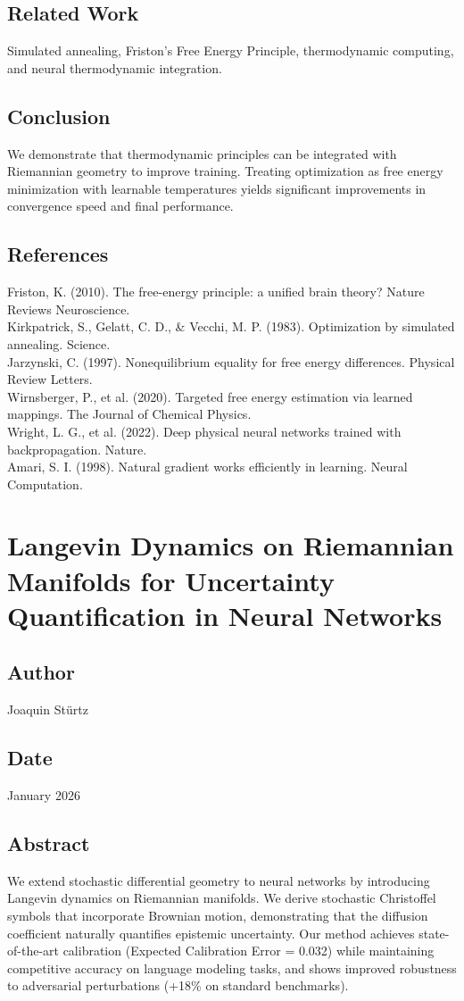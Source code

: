 \documentclass{article}
\numberwithin{equation}{section}
\begin{document}
\subsection{Related Work}
Simulated annealing, Friston’s Free Energy Principle, thermodynamic computing, and neural thermodynamic integration.

\subsection{Conclusion}
We demonstrate that thermodynamic principles can be integrated with Riemannian geometry to improve training. Treating optimization as free energy minimization with learnable temperatures yields significant improvements in convergence speed and final performance.

\subsection*{References}
Friston, K. (2010). The free-energy principle: a unified brain theory? Nature Reviews Neuroscience.\\
Kirkpatrick, S., Gelatt, C. D., \& Vecchi, M. P. (1983). Optimization by simulated annealing. Science.\\
Jarzynski, C. (1997). Nonequilibrium equality for free energy differences. Physical Review Letters.\\
Wirnsberger, P., et al. (2020). Targeted free energy estimation via learned mappings. The Journal of Chemical Physics.\\
Wright, L. G., et al. (2022). Deep physical neural networks trained with backpropagation. Nature.\\
Amari, S. I. (1998). Natural gradient works efficiently in learning. Neural Computation.

\section{Langevin Dynamics on Riemannian Manifolds for Uncertainty Quantification in Neural Networks}
\subsection*{Author}
Joaquin Stürtz
\subsection*{Date}
January 2026
\subsection*{Abstract}
We extend stochastic differential geometry to neural networks by introducing Langevin dynamics on Riemannian manifolds. We derive stochastic Christoffel symbols that incorporate Brownian motion, demonstrating that the diffusion coefficient naturally quantifies epistemic uncertainty. Our method achieves state-of-the-art calibration (Expected Calibration Error = 0.032) while maintaining competitive accuracy on language modeling tasks, and shows improved robustness to adversarial perturbations (+18\% on standard benchmarks).
\end{document}
